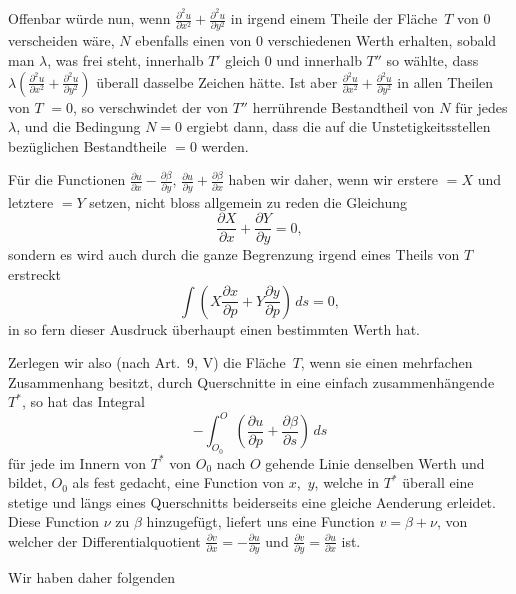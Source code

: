 \documentclass[a4paper,12pt]{article}
\begin{document}
Offenbar w\"{u}rde nun, wenn
$\displaystyle 
   \frac{\partial^2 u}{\partial x^2}
 + \frac{\partial^2 u}{\partial y^2}$
in irgend einem Theile der Fl\"{a}che~$T$ von $0$ verscheiden
w\"{a}re, $N$ ebenfalls einen von $0$ verschiedenen Werth
erhalten, sobald man $\lambda$, was frei steht, innerhalb $T'$
gleich $0$ und innerhalb $T''$ so w\"{a}hlte, dass
$\displaystyle \lambda
   \left(
      \frac{\partial^2 u}{\partial x^2}
    + \frac{\partial^2 u}{\partial y^2}
   \right)$
\"{u}berall dasselbe Zeichen h\"{a}tte.  Ist aber
$\displaystyle 
   \frac{\partial^2 u}{\partial x^2}
 + \frac{\partial^2 u}{\partial y^2}$
in allen Theilen von $T$ $= 0$, so verschwindet der von $T''$
herr\"{u}hrende Bestandtheil von $N$ f\"{u}r jedes $\lambda$, und
die Bedingung $N = 0$ ergiebt dann, dass die auf die
Unstetigkeitsstellen bez\"{u}glichen Bestandtheile $= 0$ werden.

F\"{u}r die Functionen
$\displaystyle
   \frac{\partial u}{\partial x}
 - \frac{\partial \beta}{\partial y}$,
$\displaystyle
   \frac{\partial u}{\partial y}
 + \frac{\partial \beta}{\partial x}$
haben wir daher, wenn wir erstere $= X$ und letztere $= Y$
setzen, nicht bloss allgemein zu reden die Gleichung
\[ \frac{\partial X}{\partial x} + \frac{\partial Y}{\partial y}
   = 0,\]
sondern es wird auch durch die ganze Begrenzung irgend eines
Theils von $T$ erstreckt
\[ \int  \left(
            X \frac{\partial x}{\partial p}
          + Y \frac{\partial y}{\partial p}
         \right) \, ds = 0,\]
in so fern dieser Ausdruck \"{u}berhaupt einen bestimmten Werth
hat.

Zerlegen wir also (nach Art.~9, V) die Fl\"{a}che~$T$, wenn sie
einen mehrfachen Zusammenhang besitzt, durch Querschnitte in eine
einfach zusammenh\"{a}ngende $T^*$, so hat das Integral
\[ - \int_{O_0}^O
         \left(
            \frac{\partial u}{\partial p}
          + \frac{\partial \beta}{\partial s}
         \right) \, ds \]
f\"{u}r jede im Innern von $T^*$ von $O_0$ nach $O$ gehende Linie
denselben Werth und bildet, $O_0$ als fest gedacht, eine Function
von $x$,~$y$, welche in $T^*$ \"{u}berall eine stetige und
l\"{a}ngs eines Querschnitts beiderseits eine gleiche Aenderung
erleidet. Diese Function $\nu$ zu $\beta$ hinzugef\"{u}gt,
liefert uns eine Function $v = \beta + \nu$, von welcher der
Differentialquotient
$\displaystyle
      \frac{\partial v}{\partial x}
  = - \frac{\partial u}{\partial y}$
und
$\displaystyle
      \frac{\partial v}{\partial y}
  =   \frac{\partial u}{\partial x}$
ist.

Wir haben daher folgenden
\end{document}
